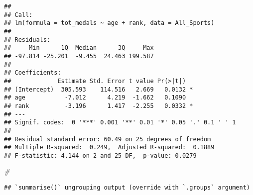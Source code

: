 \documentclass[]{article}
\newenvironment{Shaded}{\begin{snugshade}}{\end{snugshade}}
\newcommand{\CommentTok}[1]{\textcolor[rgb]{0.56,0.35,0.01}{\textit{#1}}}
\newcommand{\DataTypeTok}[1]{\textcolor[rgb]{0.13,0.29,0.53}{#1}}
\newcommand{\DecValTok}[1]{\textcolor[rgb]{0.00,0.00,0.81}{#1}}
\newcommand{\KeywordTok}[1]{\textcolor[rgb]{0.13,0.29,0.53}{\textbf{#1}}}
\newcommand{\NormalTok}[1]{#1}
\newcommand{\OperatorTok}[1]{\textcolor[rgb]{0.81,0.36,0.00}{\textbf{#1}}}
\newcommand{\OtherTok}[1]{\textcolor[rgb]{0.56,0.35,0.01}{#1}}
\newcommand{\StringTok}[1]{\textcolor[rgb]{0.31,0.60,0.02}{#1}}
\begin{document}
\begin{verbatim}
## 
## Call:
## lm(formula = tot_medals ~ age + rank, data = All_Sports)
## 
## Residuals:
##     Min      1Q  Median      3Q     Max 
## -97.814 -25.201  -9.455  24.463 199.587 
## 
## Coefficients:
##             Estimate Std. Error t value Pr(>|t|)  
## (Intercept)  305.593    114.516   2.669   0.0132 *
## age           -7.012      4.219  -1.662   0.1090  
## rank          -3.196      1.417  -2.255   0.0332 *
## ---
## Signif. codes:  0 '***' 0.001 '**' 0.01 '*' 0.05 '.' 0.1 ' ' 1
## 
## Residual standard error: 60.49 on 25 degrees of freedom
## Multiple R-squared:  0.249,  Adjusted R-squared:  0.1889 
## F-statistic: 4.144 on 2 and 25 DF,  p-value: 0.0279
\end{verbatim}

\begin{Shaded}
\begin{Highlighting}[]
\CommentTok{#}
\end{Highlighting}
\end{Shaded}

\begin{Shaded}
\end{Shaded}

\begin{verbatim}
## `summarise()` ungrouping output (override with `.groups` argument)
\end{verbatim}
\end{document}

